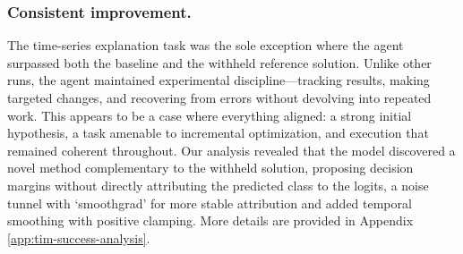 \documentclass[11pt]{article}
\let\oldtexttt\texttt
\renewcommand{\texttt}[1]{{\fontseries{m}\selectfont\oldtexttt{#1}}}
\theoremstyle{plain}
\theoremstyle{definition}
\theoremstyle{remark}
\begin{document}
\subsubsection{Consistent improvement.} The time-series explanation task was the sole exception where the agent surpassed both the baseline and the withheld reference solution. Unlike other runs, the agent maintained experimental discipline—tracking results, making targeted changes, and recovering from errors without devolving into repeated work. This appears to be a case where everything aligned: a strong initial hypothesis, a task amenable to incremental optimization, and execution that remained coherent throughout. Our analysis revealed that the model discovered a novel method complementary to the withheld solution, proposing decision margins without directly attributing the predicted class to the logits, a noise tunnel with `smoothgrad' for more stable attribution and added temporal smoothing with positive clamping. 
More details are provided in Appendix \ref{app:tim-success-analysis}.




\end{document}
